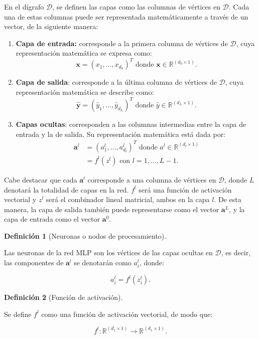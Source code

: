 \documentclass[
  us-letterpaper,
]{scrreprt}
\theoremstyle{plain}
\theoremstyle{definition}
\newtheorem{definition}{Definición}[chapter]
\theoremstyle{definition}
\theoremstyle{plain}
\theoremstyle{remark}
\begin{document}
En el dígrafo \(\mathscr D\), se definen las capas como las columnas de
vértices en \(\mathscr D\). Cada una de estas columnas puede ser
representada matemáticamente a través de un vector, de la siguiente
manera:

\begin{enumerate}
\def\labelenumi{\arabic{enumi}.}
\item
  \textbf{Capa de entrada:} corresponde a la primera columna de vértices
  de \(\mathscr D\), cuya representación matemática se expresa como:
  \[\mathbf x = (x_1, \ldots, x_{d_0})^T \text{ donde } \mathbf x \in \mathbb{R}^{(d_0 \times 1)}.\]
\item
  \textbf{Capa de salida}: corresponde a la última columna de vértices
  de \(\mathscr D\), cuya representación matemática se describe como:
  \[\hat{\mathbf y} = (\hat{y}_1, \ldots, \hat{y}_{d_L})^T \text{ donde } \hat{y}\in\mathbb{R}^{(d_L\times 1)}.\]
\item
  \textbf{Capas ocultas}: corresponden a las columnas intermedias entre
  la capa de entrada y la de salida. Su representación matemática está
  dada por: \[\begin{split}
  \mathbf a^l &= (a_{1}^l, \ldots, a_{d_l}^l)^T \text{ donde } a^l\in\mathbb{R}^{(d_l\times 1)}\\ &= f^l(z^l)\text{ con } l = 1, \ldots, L - 1.
  \end{split}\]
\end{enumerate}

Cabe destacar que cada \(\mathbf a^l\) corresponde a una columna de
vértices en \(\mathscr D\), donde \(L\) denotará la totalidad de capas
en la red. \(f^l\) será una función de activación vectorial y \(z^l\)
será el combinador lineal matricial, ambos en la capa \(l\). De esta
manera, la capa de salida también puede representarse como el vector
\(\mathbf a^L\), y la capa de entrada como el vector \(\mathbf a^0\).

\begin{definition}[Neuronas o nodos de
procesamiento]\protect\hypertarget{def-nodos}{}\label{def-nodos}

Las neuronas de la red MLP son los vértices de las capas ocultas en
\(\mathscr D\), es decir, las componentes de \(\mathbf a^l\) se
denotarán como \(a_i^l\), donde:

\[
a_i^l=f^l(z_i^l).
\]

\end{definition}

\begin{definition}[Función de
activación]\protect\hypertarget{def-funac}{}\label{def-funac}

Se define \(f^l\) como una función de activación vectorial, de modo que:

\[
f^l: \mathbb R^{(d_1\times 1)}\rightarrow \mathbb R^{(d_1\times 1)}.
\]

\end{definition}
\end{document}
